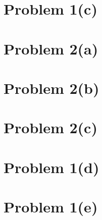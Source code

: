 \documentclass[openany,11pt]{homework}
\begin{document}
\section*{Problem 1(c)}

\section*{Problem 2(a)}

\section*{Problem 2(b)}

\section*{Problem 2(c)}

\section*{Problem 1(d)}

\section*{Problem 1(e)}
\end{document}
